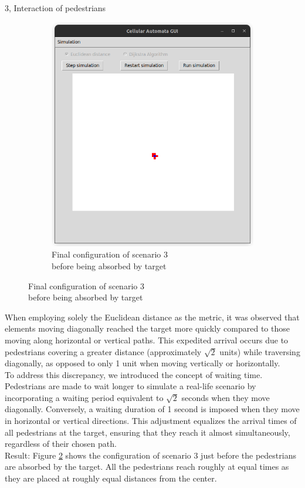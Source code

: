 \documentclass[10pt,a4paper]{article}
\begin{document}
\begin{task}{3, Interaction of pedestrians}
\begin{figure}
\begin{subfigure}[t]{0.4\textwidth}
     \includegraphics[width=\textwidth]{images/scenario3_final.png}
     \caption{Final configuration of scenario 3 \\ before being absorbed by target}
     \label{fig:scenario3_final}
 \end{subfigure}
\end{figure}

When employing solely the Euclidean distance as the metric, it was observed that elements moving diagonally reached the target more quickly compared to those moving along horizontal or vertical paths. This expedited arrival occurs due to pedestrians covering a greater distance (approximately $\sqrt{2}$ units) while traversing diagonally, as opposed to only 1 unit when moving vertically or horizontally. \\

To address this discrepancy, we introduced the concept of waiting time. Pedestrians are made to wait longer to simulate a real-life scenario by incorporating a waiting period equivalent to $\sqrt{2}$ seconds when they move diagonally. Conversely, a waiting duration of 1 second is imposed when they move in horizontal or vertical directions. This adjustment equalizes the arrival times of all pedestrians at the target, ensuring that they reach it almost simultaneously, regardless of their chosen path. \\

Result: Figure \ref{fig:scenario3_final} shows the configuration of scenario 3 just before the pedestrians are absorbed by the target. All the pedestrians reach roughly at equal times as they are placed at roughly equal distances from the center.
\end{task}
\end{document}
